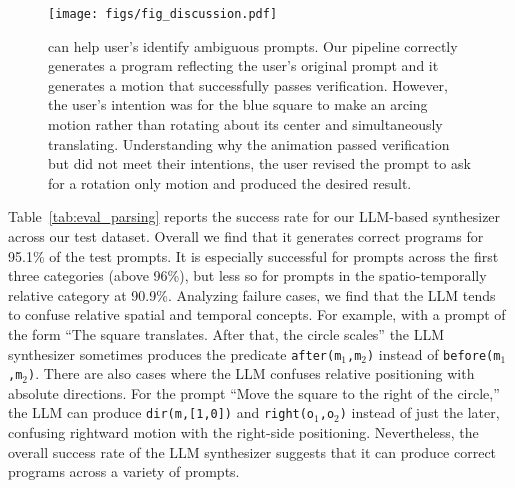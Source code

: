 



\begin{figure*}[t]
  \centering
    \texttt{[image: figs/fig\_discussion.pdf]}
    \vspace{-2em}
    \caption{\dslname{} can help user's identify ambiguous
      prompts. Our pipeline correctly generates a \dslname{} program
      reflecting the user's original prompt and it generates a motion that successfully
      passes verification. However, the user's intention was for the
      blue square to make an arcing motion rather
      than rotating about its center and simultaneously
      translating. Understanding why the animation passed verification
      but did not meet their intentions, the user revised the prompt to
      ask for a rotation only motion and produced the desired result.
    }
    \vspace{-1em}
    \label{fig:discussion}
\end{figure*}

\vspace{0.5em}
Table~\ref{tab:eval_parsing} reports the success rate for our
LLM-based \dslname{} synthesizer across our test dataset.
%
Overall we find that it 
generates correct \dslname{} programs for 95.1\% of the test prompts.  It is
especially successful for prompts across the first three categories
(above 96\%), but less so for prompts in the spatio-temporally
relative category at 90.9\%.
%
Analyzing failure cases, we find that the LLM tends to
confuse relative spatial and temporal concepts.  For example, with a
prompt of the form ``The square translates. After that, the
circle scales'' the LLM \dslname{} synthesizer sometimes produces the predicate
\texttt{after(m$_1$,m$_2$)} instead of \texttt{before(m$_1$,m$_2$)}.
%
%
There are also cases where the LLM confuses relative
positioning with absolute directions.  For the prompt ``Move the
square to the right of the circle,'' the LLM can produce
\texttt{dir(m,[1,0])} and \texttt{right(o$_1$,o$_2$)} instead of just
the later, confusing rightward motion with the right-side
positioning.
%
Nevertheless, the overall success rate of the LLM \dslname{}
synthesizer suggests that it can produce correct programs
across a variety of prompts.


